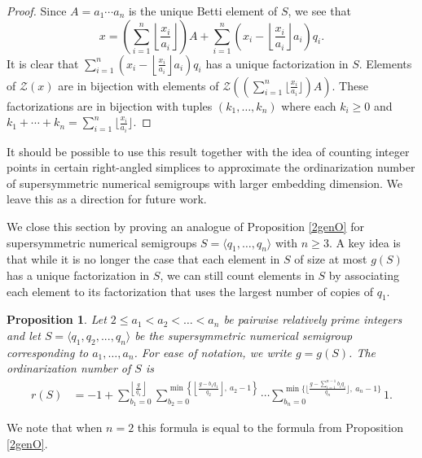 \documentclass[12pt]{amsart}
\theoremstyle{plain}\newtheorem{proposition}{Proposition}[section]
\newtheorem{prop}[proposition]{Proposition}
\begin{document}
\begin{proof}
Since $A = a_1 \cdots a_n$ is the unique Betti element of $S$, we see that 
\[
x = \left(\sum\limits_{i=1}^n\left\lfloor \frac{x_i}{a_i}\right\rfloor\right) A + \sum_{i=1}^n \left(x_i-\left\lfloor \frac{x_i}{a_i}\right\rfloor a_i \right) q_i.
\] 
It is clear that $\sum\limits_{i=1}^n \left(x_i-\left\lfloor \frac{x_i}{a_i}\right\rfloor a_i\right) q_i$ has a unique factorization in $S$.  Elements of $\mathcal{Z}(x)$ are in bijection with elements of $\mathcal{Z}\left(\left(\sum\limits_{i=1}^n\big\lfloor \frac{x_i}{a_i}\big\rfloor\right) A\right)$.  These factorizations are  in bijection with tuples $(k_1,\ldots, k_n)$ where each $k_i \ge 0$ and $k_1+\cdots + k_n = \sum\limits_{i=1}^n\big\lfloor \frac{x_i}{a_i}\big\rfloor$. 
\end{proof}
It should be possible to use this result together with the idea of counting integer points in certain right-angled simplices to approximate the ordinarization number of supersymmetric numerical semigroups with larger embedding dimension.  We leave this as a direction for future work.


We close this section by proving an analogue of Proposition \ref{2genO} for supersymmetric numerical semigroups $S = \langle q_1, \ldots, q_n\rangle$ with $n \ge 3$.  A key idea is that while it is no longer the case that each element in $S$ of size at most $g(S)$ has a unique factorization in $S$, we can still count elements in $S$ by associating each element to its factorization that uses the largest number of copies of $q_1$.
\begin{prop}\label{Theorem_ord_supersym}
Let $2\le a_1 < a_2 < \ldots < a_n$ be pairwise relatively prime integers and let $S=\langle q_1,q_2,...,q_n\rangle$ be the supersymmetric numerical semigroup corresponding to $a_1,\ldots, a_n$.  For ease of notation, we write $g = g(S)$.  The ordinarization number of $S$ is 
\begin{align*}
r(S)&=-1+\sum_{b_1=0}^{\left\lfloor\frac{g}{q_1}\right\rfloor}\sum_{b_2=0}^{\min\left\{ \left\lfloor\frac{g-b_1 q_1}{q_2}\right\rfloor,\ a_2-1\right\}}\cdots\sum_{b_n=0}^{\min\big\{ \big\lfloor\frac{g-\sum\limits_{i=1}^{n-1}b_i q_i}{q_n}\big\rfloor,\ a_n-1\big\}} 1.
\end{align*}
\end{prop}
\noindent We note that when $n=2$ this formula is equal to the formula from Proposition \ref{2genO}.  
\end{document}
